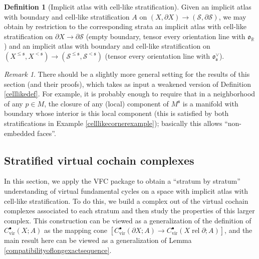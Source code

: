 \documentclass[12pt]{article}
\theoremstyle{definition}
\newtheorem{definition}[theorem]{Definition}
\theoremstyle{remark}
\newtheorem{remark}[theorem]{Remark}
\numberwithin{equation}{subsection}
\newcommand{\s}{\mathfrak s}
\newcommand{\oo}{\mathfrak o}
\newcommand{\RR}{\mathbb R}
\newcommand{\SSS}{\mathcal S}
\newcommand{\vir}{\mathrm{vir}}
\newcommand{\rel}{\operatorname{rel}}
\begin{document}
\begin{definition}[Implicit atlas with cell-like stratification]
Given an implicit atlas with boundary and cell-like stratification $A$ on $(X,\partial X)\to(\SSS,\partial\SSS)$, we may obtain by restriction to the corresponding strata an implicit atlas with cell-like stratification on $\partial X\to\partial\SSS$ (empty boundary, tensor every orientation line with $\oo_\RR$) and an implicit atlas with boundary and cell-like stratification on $(X^{\leq\s},X^{<\s})\to(\SSS^{\leq\s},\SSS^{<\s})$ (tensor every orientation line with $\oo_\s^\vee$).
\end{definition}

\begin{remark}
There should be a slightly more general setting for the results of this section (and their proofs), which takes as input a weakened version of Definition \ref{celllikedef}.  For example, it is probably enough to require that in a neighborhood of any $p\in M$, the closure of any (local) component of $M^\s$ is a manifold with boundary whose interior is this local component (this is satisfied by both stratifications in Example \ref{celllikecornerexample}); basically this allows ``non-embedded faces''.
\end{remark}

\subsection{Stratified virtual cochain complexes}\label{stratvirtcochainssec}

In this section, we apply the VFC package to obtain a ``stratum by stratum'' understanding of virtual fundamental cycles on a space with implicit atlas with cell-like stratification.  To do this, we build a complex out of the virtual cochain complexes associated to each stratum and then study the properties of this larger complex.  This construction can be viewed as a generalization of the definition of $C_\vir^\bullet(X;A)$ as the mapping cone $[C^\bullet_\vir(\partial X;A)\to C^\bullet_\vir(X\rel\partial;A)]$, and the main result here can be viewed as a generalization of Lemma \ref{compatibilityoflongexactsequence}.
\end{document}

